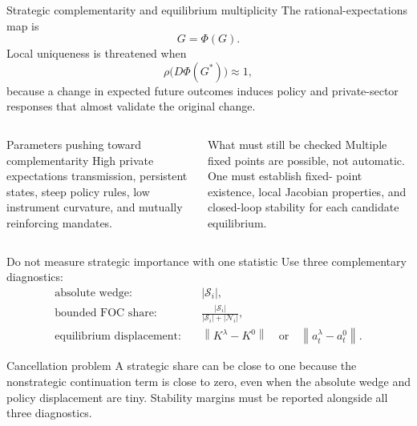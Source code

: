 \documentclass[10pt,aspectratio=169]{beamer}
\newcommand{\norm}[1]{\left\lVert#1\right\rVert}
\begin{document}
\begin{frame}{Strategic complementarity and equilibrium multiplicity}
The rational-expectations map is
\begin{equation*}
G=\Phi(G).
\end{equation*}
Local uniqueness is threatened when
\begin{equation*}
\rho\bigl(D\Phi(G^*)\bigr)\approx1,
\end{equation*}
because a change in expected future outcomes induces policy and private-sector
responses that almost validate the original change.
\begin{columns}[T,onlytextwidth]
\begin{block}{Parameters pushing toward complementarity}
High private expectations transmission, persistent states, steep policy rules,
low instrument curvature, and mutually reinforcing mandates.
\end{block}
\begin{alertblock}{What must still be checked}
Multiple fixed points are possible, not automatic. One must establish fixed-
point existence, local Jacobian properties, and closed-loop stability for each
candidate equilibrium.
\end{alertblock}
\end{columns}
\end{frame}

\begin{frame}{Do not measure strategic importance with one statistic}
Use three complementary diagnostics:
\begin{align*}
\text{absolute wedge:}\quad & |\mathcal S_i|,\\
\text{bounded FOC share:}\quad &
\frac{|\mathcal S_i|}{|\mathcal S_i|+|\mathcal N_i|},\\
\text{equilibrium displacement:}\quad &
\norm{K^{\lambda}-K^{0}}\quad\text{or}\quad
\norm{a_t^{\lambda}-a_t^{0}}.
\end{align*}
\begin{alertblock}{Cancellation problem}
A strategic share can be close to one because the nonstrategic continuation
term is close to zero, even when the absolute wedge and policy displacement are
tiny. Stability margins must be reported alongside all three diagnostics.
\end{alertblock}
\end{frame}
\end{document}
